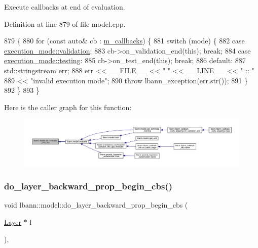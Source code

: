 Execute callbacks at end of evaluation. 

Definition at line 879 of file model.\+cpp.


\begin{DoxyCode}
879                                                    \{
880   \textcolor{keywordflow}{for} (\textcolor{keyword}{const} \textcolor{keyword}{auto}& cb : \hyperlink{classlbann_1_1model_a07b511fef30368494c2ad80922ffd0eb}{m\_callbacks}) \{
881     \textcolor{keywordflow}{switch} (mode) \{
882     \textcolor{keywordflow}{case} \hyperlink{base_8hpp_a2781a159088df64ed7d47cc91c4dc0a8aa617908b172c473cb8e8cda059e55bf0}{execution\_mode::validation}:
883       cb->on\_validation\_end(\textcolor{keyword}{this}); \textcolor{keywordflow}{break};
884     \textcolor{keywordflow}{case} \hyperlink{base_8hpp_a2781a159088df64ed7d47cc91c4dc0a8aae2b1fca515949e5d54fb22b8ed95575}{execution\_mode::testing}:
885       cb->on\_test\_end(\textcolor{keyword}{this}); \textcolor{keywordflow}{break};
886     \textcolor{keywordflow}{default}:
887       std::stringstream err;
888       err << \_\_FILE\_\_ << \textcolor{stringliteral}{" "} << \_\_LINE\_\_ << \textcolor{stringliteral}{" :: "}
889           << \textcolor{stringliteral}{"invalid execution mode"};
890       \textcolor{keywordflow}{throw} lbann\_exception(err.str());
891     \}
892   \}
893 \}
\end{DoxyCode}
Here is the caller graph for this function\+:\nopagebreak
\begin{figure}[H]
\begin{center}
\leavevmode
\includegraphics[width=350pt]{classlbann_1_1model_ab123ed691fb6e9f52d468914a1f4460c_icgraph}
\end{center}
\end{figure}
\mbox{\label{classlbann_1_1model_a51dc59ea8dd4bc689854732269aaf001}} 
\subsubsection{\texorpdfstring{do\+\_\+layer\+\_\+backward\+\_\+prop\+\_\+begin\+\_\+cbs()}{do\_layer\_backward\_prop\_begin\_cbs()}}
{\footnotesize\ttfamily void lbann\+::model\+::do\+\_\+layer\+\_\+backward\+\_\+prop\+\_\+begin\+\_\+cbs (\begin{DoxyParamCaption}\item[{\hyperlink{classlbann_1_1Layer}{Layer} $\ast$}]{l }\end{DoxyParamCaption})\hspace{0.3cm}{\ttfamily [protected]}, {\ttfamily [virtual]}}

